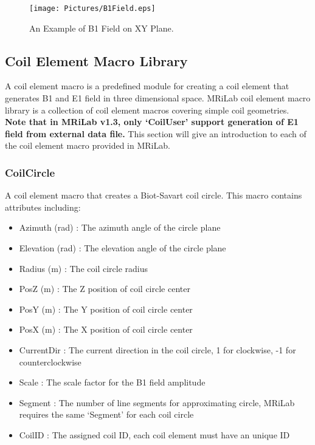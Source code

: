 \documentclass{book}%
\begin{document}
\begin{figure}[htbp]
	\centering
		\texttt{[image: Pictures/B1Field.eps]}
	\caption{An Example of B1 Field on XY Plane.}
	\label{fig:B1Field}
\end{figure}


\subsection{Coil Element Macro Library}

A coil element macro is a predefined module for creating a coil element that generates B1 and E1 field in three dimensional space. MRiLab coil element macro library is a collection of coil element macros covering simple coil geometries. \textbf{Note that in MRiLab v1.3, only `CoilUser' support generation of E1 field from external data file.} This section will give an introduction to each of the coil element macro provided in MRiLab.

\subsubsection{CoilCircle}

A coil element macro that creates a Biot-Savart coil circle. This macro contains attributes including:

\begin{itemize}
	\item Azimuth (rad) : The azimuth angle of the circle plane
	\item Elevation (rad) : The elevation angle of the circle plane
	\item Radius (m) : The coil circle radius
	\item PosZ (m) : The Z position of coil circle center
  \item PosY (m) : The Y position of coil circle center
	\item PosX (m) : The X position of coil circle center
	\item CurrentDir : The current direction in the coil circle, 1 for clockwise, -1 for counterclockwise
	\item Scale : The scale factor for the B1 field amplitude
	\item Segment : The number of line segments for approximating circle, MRiLab requires the same `Segment' for each coil circle
	\item CoilID : The assigned coil ID, each coil element must have an unique ID
\end{itemize}
\end{document}
